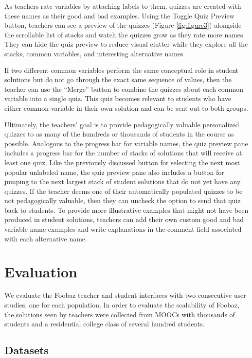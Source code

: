 As teachers rate variables by attaching labels to them, quizzes are created with these names as their good and bad examples. Using the Toggle Quiz Preview button, teachers can see a preview of the quizzes (Figure \ref{fig:figure3}) alongside the scrollable list of stacks and watch the quizzes grow as they rate more names. They can hide the quiz preview to reduce visual clutter while they explore all the stacks, common variables, and interesting alternative names.

If two different common variables perform the same conceptual role in student solutions but do not go through the exact same sequence of values, then the teacher can use the ``Merge'' button to combine the quizzes about each common variable into a single quiz. This quiz becomes relevant to students who have either common variable in their own solution and can be sent out to both groups.

Ultimately, the teachers' goal is to provide pedagogically valuable personalized quizzes to as many of the hundreds or thousands of students in the course as possible. Analogous to the progress bar for variable names, the quiz preview pane includes a progress bar for the number of stacks of solutions that will receive at least one quiz. Like the previously discussed button for selecting the next most popular unlabeled name, the quiz preview pane also includes a button for jumping to the next largest stack of student solutions that do not yet have any quizzes. If the teacher deems one of their automatically populated quizzes to be not pedagogically valuable, then they can uncheck the option to send that quiz back to students. To provide more illustrative examples that might not have been produced in student solutions, teachers can add their own custom good and bad variable name examples and write explanations in the comment field associated with each alternative name.

\section{Evaluation}

We evaluate the Foobaz teacher and student interfaces with two consecutive user studies, one for each population. In order to evaluate the scalability of Foobaz, the solutions seen by teachers were collected from MOOCs with thousands of students and a residential college class of several hundred students.

\subsection{Datasets}

